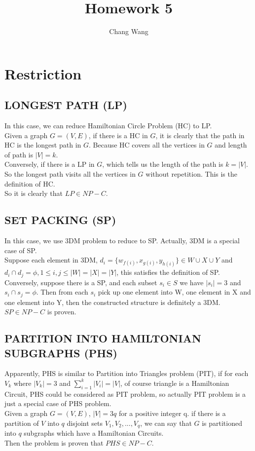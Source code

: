 \documentclass[12pt]{report}
\title{Homework 5}
\author{Chang Wang}
\begin{document}
\maketitle

\section{Restriction}
\subsection{LONGEST PATH (LP)}
In this case, we can reduce Hamiltonian Circle Problem (HC) to LP. \\
Given a graph $G=(V, E)$, if there is a HC in $G$, it is clearly that the path in HC is the longest path in $G$. Because HC covers all the vertices in $G$ and length of path is $|V|=k$. \\
Conversely, if there is a LP in $G$, which tells us the length of the path is $k=|V|$. So the longest path visits all the vertices in $G$ without repetition. This is the definition of HC. \\
So it is clearly that $LP \in NP-C$.

\subsection{SET PACKING (SP)}
In this case, we use 3DM problem to reduce to SP. Actually, 3DM is a special case of SP.\\
Suppose each element in 3DM, $d_{i} = \{w_{f(i)}, x_{g(i)}, y_{h(i)}\} \in W \cup X \cup Y$ and $d_{i} \cap d_{j} = \phi, 1 \le i, j \le |W|=|X|=|Y|$, this satisfies the definition of SP. \\
Conversely, suppose there is a SP, and each subset $s_{i} \in S$ we have $|s_{i}| = 3$ and $s_{i} \cap s_{j} = \phi$. Then from each $s_{i}$ pick up one element into W, one element in X and one element into Y, then the constructed structure is definitely a 3DM. \\
$SP \in NP-C$ is proven.

\subsection{PARTITION INTO HAMILTONIAN SUBGRAPHS (PHS)}
Apparently, PHS is similar to Partition into Triangles problem (PIT), if for each $V_{k}$ where $|V_{k}| = 3$ and $\sum_{i=1}^{k}|V_{i}| = |V|$, of course triangle is a Hamiltonian Circuit, PHS could be considered as PIT problem, so actually PIT problem is a just a special case of PHS problem. \\
Given a graph $G = (V, E)$, $|V| = 3q$ for a positive integer q. if there is a partition of $V$ into $q$ disjoint sets $V_{1}, V_{2}, ..., V_{q}$, we can say that $G$ is partitioned into $q$ subgraphs which have a Hamiltonian Circuits. \\
Then the problem is proven that $PHS \in NP-C$.
\end{document}
